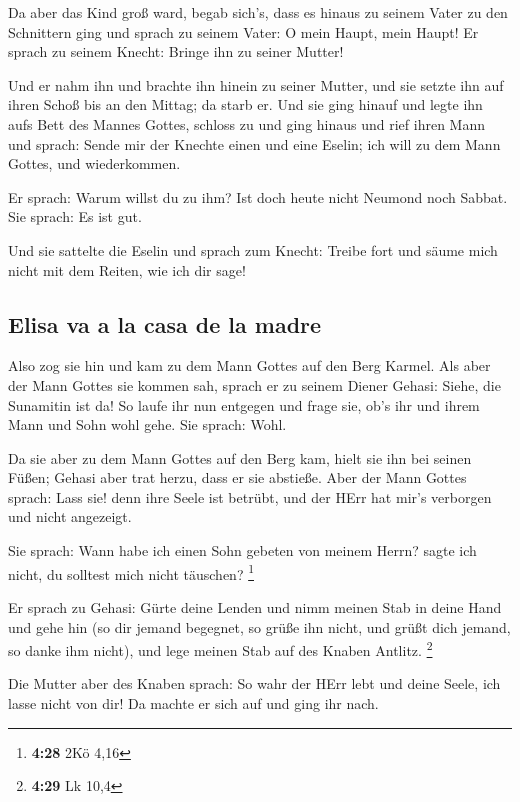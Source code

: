  Da aber das Kind groß ward, begab sich's, dass es hinaus
zu seinem Vater zu den Schnittern ging  und sprach zu
seinem Vater: O mein Haupt, mein Haupt! Er sprach zu seinem Knecht:
Bringe ihn zu seiner Mutter!

 Und er nahm ihn und brachte ihn hinein zu seiner Mutter,
und sie setzte ihn auf ihren Schoß bis an den Mittag; da starb er.
 Und sie ging hinauf und legte ihn aufs Bett des Mannes
Gottes, schloss zu und ging hinaus  und rief ihren Mann
und sprach: Sende mir der Knechte einen und eine Eselin; ich will zu dem
Mann Gottes, und wiederkommen.

 Er sprach: Warum willst du zu ihm? Ist doch heute nicht
Neumond noch Sabbat. Sie sprach: Es ist gut.

 Und sie sattelte die Eselin und sprach zum Knecht:
Treibe fort und säume mich nicht mit dem Reiten, wie ich dir sage!

\hypertarget{elisa-va-a-la-casa-de-la-madre}{%
\subsection{Elisa va a la casa de la
madre}\label{elisa-va-a-la-casa-de-la-madre}}

 Also zog sie hin und kam zu dem Mann Gottes auf den Berg
Karmel. Als aber der Mann Gottes sie kommen sah, sprach er zu seinem
Diener Gehasi: Siehe, die Sunamitin ist da!  So laufe ihr
nun entgegen und frage sie, ob's ihr und ihrem Mann und Sohn wohl gehe.
Sie sprach: Wohl.

 Da sie aber zu dem Mann Gottes auf den Berg kam, hielt
sie ihn bei seinen Füßen; Gehasi aber trat herzu, dass er sie abstieße.
Aber der Mann Gottes sprach: Lass sie! denn ihre Seele ist betrübt, und
der HErr hat mir's verborgen und nicht angezeigt.

 Sie sprach: Wann habe ich einen Sohn gebeten von meinem
Herrn? sagte ich nicht, du solltest mich nicht täuschen? \footnote{\textbf{4:28}
  2Kö 4,16}

 Er sprach zu Gehasi: Gürte deine Lenden und nimm meinen
Stab in deine Hand und gehe hin (so dir jemand begegnet, so grüße ihn
nicht, und grüßt dich jemand, so danke ihm nicht), und lege meinen Stab
auf des Knaben Antlitz. \footnote{\textbf{4:29} Lk 10,4}

 Die Mutter aber des Knaben sprach: So wahr der HErr lebt
und deine Seele, ich lasse nicht von dir! Da machte er sich auf und ging
ihr nach.

